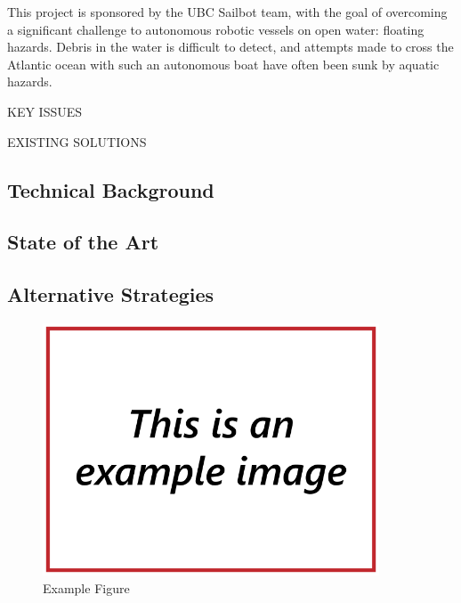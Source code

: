 This project is sponsored by the UBC Sailbot team, with the goal of overcoming a significant challenge to autonomous robotic vessels on open water: floating hazards. Debris in the water is difficult to detect, and attempts made to cross the Atlantic ocean with such an autonomous boat have often been sunk by aquatic hazards.

KEY ISSUES

EXISTING SOLUTIONS

\subsection{\label{sec:intro:technical-background}Technical Background}
\subsection{\label{sec:intro:commercial}State of the Art}
\subsection{\label{sec:intro:alternatives}Alternative Strategies}

\begin{figure}

\includegraphics[width=100mm,natwidth=640,natheight=480]{"./image/Example"}
\caption{\label{fig:software_overall}Example Figure}
\end{figure}